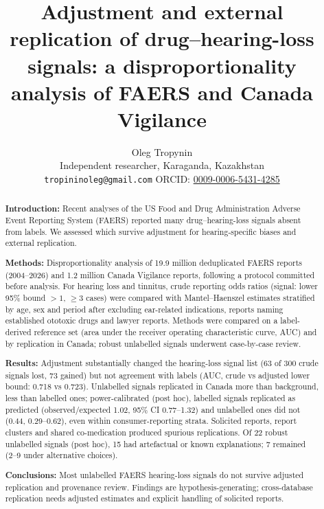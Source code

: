 \documentclass[11pt]{article}
\title{Adjustment and external replication of drug--hearing-loss signals:
a disproportionality analysis of FAERS and Canada Vigilance}
\author{Oleg Tropynin\\ \small Independent researcher, Karaganda, Kazakhstan\\ \small \texttt{tropininoleg@gmail.com}
\quad ORCID: \href{https://orcid.org/0009-0006-5431-4285}{0009-0006-5431-4285}}
\date{}
\begin{document}
\maketitle

\begin{abstract}
\noindent\textbf{Introduction:} Recent analyses of the US Food and Drug Administration Adverse Event
Reporting System (FAERS) reported many drug--hearing-loss signals absent from labels. We assessed which survive adjustment for
hearing-specific biases and external replication.

\noindent\textbf{Methods:} Disproportionality analysis of 19.9 million deduplicated FAERS reports
(2004--2026) and 1.2 million Canada Vigilance reports, following a protocol committed before
analysis. For hearing loss and tinnitus, crude reporting odds ratios (signal: lower 95\% bound $>1$, $\geq$3 cases) were
compared with Mantel--Haenszel estimates stratified by age, sex and period after excluding ear-related indications, reports
naming established ototoxic drugs and lawyer reports. Methods were compared on a label-derived reference set (area under the
receiver operating characteristic curve, AUC) and by replication in Canada; robust unlabelled signals underwent
case-by-case review.

\noindent\textbf{Results:} Adjustment substantially changed the hearing-loss signal list
(63 of 300 crude signals lost, 73 gained) but not agreement
with labels (AUC, crude vs adjusted lower bound: 0.718 vs
0.723). Unlabelled signals replicated in Canada more than background, less than labelled ones; power-calibrated (post hoc), labelled signals replicated as predicted (observed/expected
1.02, 95\% CI 0.77--1.32)
and unlabelled ones did not (0.44, 0.29--0.62),
even within consumer-reporting strata. Solicited reports, report clusters and shared
co-medication produced spurious replications. Of 22 robust unlabelled signals (post hoc), 15 had artefactual or known
explanations; 7 remained (2--9 under
alternative choices).

\noindent\textbf{Conclusions:} Most unlabelled FAERS hearing-loss signals do not survive adjusted replication and provenance
review. Findings are hypothesis-generating; cross-database replication needs adjusted estimates and explicit
handling of solicited reports.
\end{abstract}
\end{document}
